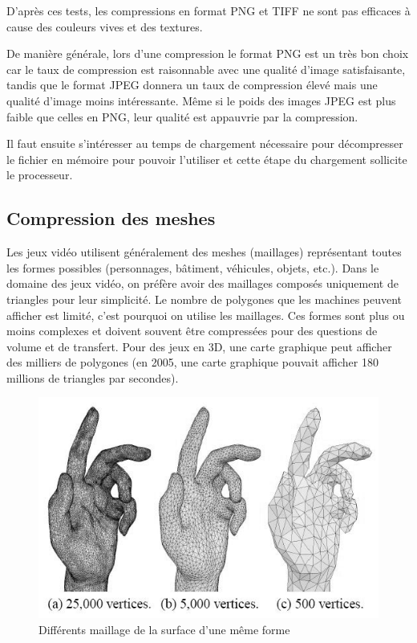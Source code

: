 \documentclass[a4paper, 11pt]{article} %
\begin{document}
D'après ces tests, les compressions en format PNG et TIFF ne sont pas efficaces à cause des couleurs vives et des textures. 

De manière générale, lors d'une compression le format PNG est un très bon choix car le taux de compression est raisonnable avec une qualité d'image satisfaisante, tandis que le format JPEG donnera un taux de compression élevé mais une qualité d'image moins intéressante. Même si le poids des images JPEG est plus faible que celles en PNG, leur qualité est appauvrie par la compression. 

Il faut ensuite s'intéresser au temps de chargement nécessaire pour décompresser le fichier en mémoire pour pouvoir l'utiliser et cette étape du chargement sollicite le processeur.

\subsection{Compression des meshes}
Les jeux vidéo utilisent généralement des meshes (maillages) représentant toutes les formes possibles (personnages, bâtiment, véhicules, objets, etc.). Dans le domaine des jeux vidéo, on préfère avoir des maillages composés uniquement de triangles pour leur simplicité. Le nombre de polygones que les machines peuvent afficher est limité, c'est pourquoi on utilise les maillages. Ces formes sont plus ou moins complexes et doivent souvent être compressées pour des questions de volume et de transfert. Pour des jeux en 3D, une carte graphique peut afficher des milliers de polygones (en 2005, une carte graphique pouvait afficher 180 millions de triangles par secondes)\cite{compression:meshes}.

\begin{figure}[!h]%
\includegraphics[width=\columnwidth]{images/meshes.jpg}%
\caption{Différents maillage de la surface d'une même forme}%
\label{}%
\end{figure}
\end{document}
